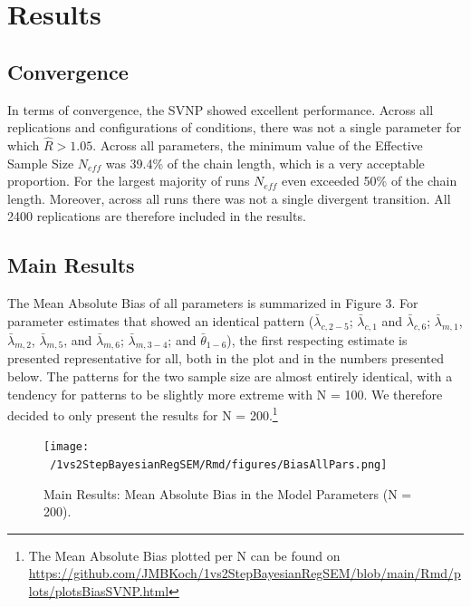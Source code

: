 \documentclass[
  man,floatsintext]{apa6}
\begin{document}
\hypertarget{results}{%
\section{Results}\label{results}}

\hypertarget{convergence}{%
\subsection{Convergence}\label{convergence}}

In terms of convergence, the SVNP showed excellent performance. Across all replications and configurations of conditions, there was not a single parameter for which \(\hat{R} > 1.05\). Across all parameters, the minimum value of the Effective Sample Size \(N_{eff}\) was 39.4\% of the chain length, which is a very acceptable proportion. For the largest majority of runs \(N_{eff}\) even exceeded 50\% of the chain length. Moreover, across all runs there was not a single divergent transition. All 2400 replications are therefore included in the results.

\hypertarget{main-results}{%
\subsection{Main Results}\label{main-results}}

The Mean Absolute Bias of all parameters is summarized in Figure 3. For parameter estimates that showed an identical pattern (\(\bar{\lambda}_{c, 2-5}\); \(\bar{\lambda}_{c, 1}\) and \(\bar{\lambda}_{c, 6}\); \(\bar{\lambda}_{m, 1}\), \(\bar{\lambda}_{m, 2}\), \(\bar{\lambda}_{m, 5}\), and \(\bar{\lambda}_{m, 6}\); \(\bar{\lambda}_{m, 3-4}\); and \(\bar{\theta}_{1-6}\)), the first respecting estimate is presented representative for all, both in the plot and in the numbers presented below. The patterns for the two sample size are almost entirely identical, with a tendency for patterns to be slightly more extreme with N = 100. We therefore decided to only present the results for N = 200.\footnote{The Mean Absolute Bias plotted per N can be found on \url{https://github.com/JMBKoch/1vs2StepBayesianRegSEM/blob/main/Rmd/plots/plotsBiasSVNP.html}}

\begin{figure}
\centering
\texttt{[image: ~/1vs2StepBayesianRegSEM/Rmd/figures/BiasAllPars.png]}
\caption{Main Results: Mean Absolute Bias in the Model Parameters (N = 200).}
\end{figure}
\end{document}
